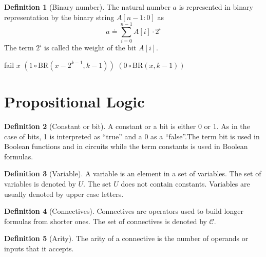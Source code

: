 \documentclass[fleqn, a4paper, 12pt, twoside]{article}
\theoremstyle{definition}
\newtheorem{definition}{Definition}
\theoremstyle{theorem}
\begin{document}
\begin{definition}[Binary number]
	The natural number $a$ is represented in binary representation by the binary string $A[n - 1 : 0]$ as
	\begin{equation*}
		a \doteq \sum_{i = 0}^{n - 1} A[i] \cdot 2^i
	\end{equation*}
	The term $2^i$ is called the weight of the bit $A[i]$.
\end{definition}

\begin{algorithm}
	\caption{$\mathrm{BR}(x,k)$ - An algorithm for computing a binary representation of a natural number $a$ using $k$ bits}
	\begin{algorithmic}[1]
			\State \Return fail
			\State \Return $x$
			\State \Return $\left( 1 \circ \mathrm{BR} \left( x - 2^{k - 1}, k - 1 \right) \right)$
			\State \Return $\left( 0 \circ \mathrm{BR} \left( x, k - 1 \right) \right)$
		\EndIf
	\end{algorithmic}
\end{algorithm}

\section{Propositional Logic}

\begin{definition}[Constant or bit]
	A constant or a bit is either 0 or 1. As in the case of bits, 1 is interpreted as ``true” and a 0 as a “false”.The term bit is used in Boolean functions and in circuits while the term constants is used in Boolean formulas.
\end{definition}

\begin{definition}[Variable]
	A variable is an element in a set of variables. The set of variables is denoted by $U$. The set $U$ does not contain constants. Variables are usually denoted by upper case letters.
\end{definition}

\begin{definition}[Connectives]
	Connectives are operators used to build longer formulas from shorter ones. The set of connectives is denoted by $\mathcal{C}$.
\end{definition}

\begin{definition}[Arity]
	The arity of a connective is the number of operands or inputs that it accepts.
\end{definition}
\end{document}
